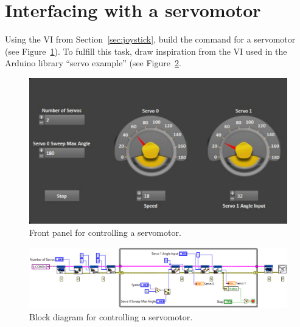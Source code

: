 \documentclass{labo}
\begin{document}
\section{Interfacing with a servomotor}
Using the VI from Section~\ref{sec:joystick}, build the command for a servomotor (see Figure~\ref{fig:servo-control}).
To fulfill this task, draw inspiration from the VI used in the Arduino library ``servo example'' (see Figure~\ref{fig:servo-block}.

\begin{figure}[ht!]
  \centering
  \includegraphics[width=.9\textwidth]{front-panel-servo.png}
  \caption{Front panel for controlling a servomotor.}
  \label{fig:servo-control}
\end{figure}

\begin{figure}[ht!]
  \centering
  \includegraphics[width=\textwidth]{block-diagram-servo.png}
  \caption{Block diagram for controlling a servomotor.}
  \label{fig:servo-block}
\end{figure}




\end{document}
